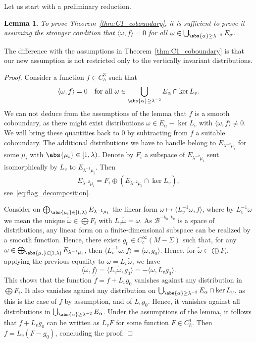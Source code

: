 \documentclass[10pt]{amsart}
\newcommand{\boB}{\mathcal{B}}
\newtheorem{lem}[thm]{Lemma}
\theoremstyle{definition}
\numberwithin{equation}{section}
\begin{document}
Let us start with a preliminary reduction.
\begin{lem}
\label{lem:stronger_assumptions} To prove Theorem~\ref{thm:C1_coboundary}, it
is sufficient to prove it assuming the stronger condition that $\langle
\omega, f \rangle = 0$ for all $\omega \in \bigcup_{\abs{\alpha} \geq
\lambda^{-2}} E_\alpha$.
\end{lem}
The difference with the assumptions in Theorem~\ref{thm:C1_coboundary} is
that our new assumption is not restricted only to the vertically invariant
distributions.
\begin{proof}
Consider a function $f \in C^3_h$ such that
\[
\langle \omega, f \rangle = 0\quad
\text{for all }\omega \in \bigcup_{\abs{\alpha} \geq \lambda^{-2}} E_\alpha \cap
\ker L_v.
\]
We can not deduce from the assumptions of the lemma that $f$ is a
smooth coboundary, as there might exist distributions $\omega \in E_\alpha -
\ker L_v$ with $\langle \omega, f \rangle \neq 0$. We will bring these
quantities back to $0$ by subtracting from $f$ a suitable coboundary. The
additional distributions we have to handle belong to $E_{\lambda^{-2}\mu_i}$
for some $\mu_i$ with $\abs{\mu_i} \in [1, \lambda)$. Denote by $F_i$ a
subspace of $E_{\lambda^{-2}\mu_i}$ sent isomorphically by $L_v$ to
$E_{\lambda^{-1}\mu_i}$. Then
\[
E_{\lambda^{-2}\mu_i} = F_i \oplus
(E_{\lambda^{-2}\mu_i} \cap \ker L_v),
\]
see~\eqref{eq:flag_decomposition}.

Consider on $\bigoplus_{\abs{\mu_i} \in [1, \lambda)} E_{\lambda^{-1}\mu_i}$
the linear form $\omega \mapsto \langle L_v^{-1}\omega, f\rangle$, where by
$L_v^{-1}\omega$ we mean the unique $\tilde \omega \in \bigoplus F_i$ with
$L_v \tilde \omega = \omega$. As $\boB^{-k_h, k_v}$ is a space of
distributions, any linear form on a finite-dimensional subspace can be
realized by a smooth function. Hence, there exists $g_0 \in
C^\infty_c(M-\Sigma)$ such that, for any $\omega \in \bigoplus_{\abs{\mu_i}
\in [1, \lambda)} E_{\lambda^{-1}\mu_i}$, then $\langle L_v^{-1}\omega,
f\rangle = \langle \omega, g_0\rangle$. Hence, for $\tilde \omega \in
\bigoplus F_i$, applying the previous equality to $\omega = L_v\tilde\omega$,
we have
\begin{equation*}
\langle \tilde \omega, f \rangle =
\langle L_v \tilde \omega, g_0 \rangle = -\langle \tilde \omega, L_v g_0 \rangle.
\end{equation*}
This shows that the function $\tilde f = f + L_v g_0$ vanishes against any
distribution in $\bigoplus F_i$. It also vanishes against any distribution on
$\bigcup_{\abs{\alpha}\geq \lambda^{-2}} E_\alpha \cap \ker L_v$, as this is
the case of $f$ by assumption, and of $L_v g_0$. Hence, it vanishes against
all distributions in $\bigcup_{\abs{\alpha} \geq \lambda^{-2}} E_\alpha$.
Under the assumptions of the lemma, it follows that $f+L_v g_0$ can be
written as $L_v F$ for some function $F \in C^1_h$. Then $f= L_v(F-g_0)$,
concluding the proof.
\end{proof}
\end{document}
